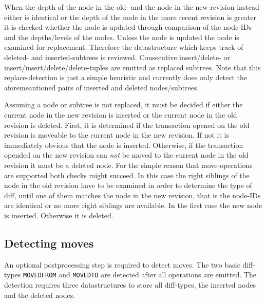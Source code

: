 When the depth of the node in the old- and the node in the new-revision instead either is identical or the depth of the node in the more recent revision is greater it is checked whether the node is updated through comparison of the node-IDs and the depths/levels of the nodes. Unless the node is updated the node is examined for replacement. Therefore the datastructure which keeps track of deleted- and inserted-subtrees is reviewed. Consecutive insert/delete- or insert/insert/delete/delete-tuples are emitted as replaced subtrees. Note that this replace-detection is just a simple heuristic and currently does only detect the aforemeantioned pairs of inserted and deleted nodes/subtrees.%

Assuming a node or subtree is not replaced, it must be decided if either the current node in the new revision is inserted or the current node in the old revision is deleted. First, it is determined if the transaction opened on the old revision is moveable to the current node in the new revision. If not it is immediately obvious that the node is inserted. Otherwise, if the transaction opended on the new revision can \emph{not} be moved to the current node in the old revision it must be a deleted node. For the simple reason that move-operations are supported both checks might succeed. In this case the right siblings of the node in the old revision have to be examined in order to determine the type of diff, until one of them matches the node in the new revision, that is the node-IDs are identical or no more right siblings are available. In the first case the new node is inserted. Otherwise it is deleted.

\subsection{Detecting moves}
An optional postprocessing step is required to detect moves. The two basic diff-types \texttt{MOVEDFROM} and \texttt{MOVEDTO} are detected after all operations are emitted. The detection requires three datastructures to store all diff-types, the inserted nodes and the deleted nodes.

